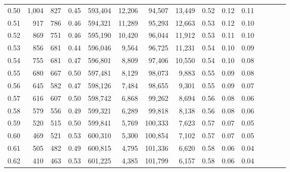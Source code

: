 \begin{tabular}{rrrcrrrrrrrrrrr}
0.50 &   1,004 &    827 &                                       0.45 &  593,404 &   12,206 &   94,507 &   13,449 &  0.52 &  0.12 &                         0.11 \\
0.51 &     917 &    786 &                                       0.46 &  594,321 &   11,289 &   95,293 &   12,663 &  0.53 &  0.12 &                         0.10 \\
0.52 &     869 &    751 &                                       0.46 &  595,190 &   10,420 &   96,044 &   11,912 &  0.53 &  0.11 &                         0.10 \\
0.53 &     856 &    681 &                                       0.44 &  596,046 &    9,564 &   96,725 &   11,231 &  0.54 &  0.10 &                         0.09 \\
0.54 &     755 &    681 &                                       0.47 &  596,801 &    8,809 &   97,406 &   10,550 &  0.54 &  0.10 &                         0.08 \\
0.55 &     680 &    667 &                                       0.50 &  597,481 &    8,129 &   98,073 &    9,883 &  0.55 &  0.09 &                         0.08 \\
0.56 &     645 &    582 &                                       0.47 &  598,126 &    7,484 &   98,655 &    9,301 &  0.55 &  0.09 &                         0.07 \\
0.57 &     616 &    607 &                                       0.50 &  598,742 &    6,868 &   99,262 &    8,694 &  0.56 &  0.08 &                         0.06 \\
0.58 &     579 &    556 &                                       0.49 &  599,321 &    6,289 &   99,818 &    8,138 &  0.56 &  0.08 &                         0.06 \\
0.59 &     520 &    515 &                                       0.50 &  599,841 &    5,769 &  100,333 &    7,623 &  0.57 &  0.07 &                         0.05 \\
0.60 &     469 &    521 &                                       0.53 &  600,310 &    5,300 &  100,854 &    7,102 &  0.57 &  0.07 &                         0.05 \\
0.61 &     505 &    482 &                                       0.49 &  600,815 &    4,795 &  101,336 &    6,620 &  0.58 &  0.06 &                         0.04 \\
0.62 &     410 &    463 &                                       0.53 &  601,225 &    4,385 &  101,799 &    6,157 &  0.58 &  0.06 &                         0.04 \\

\end{tabular}
